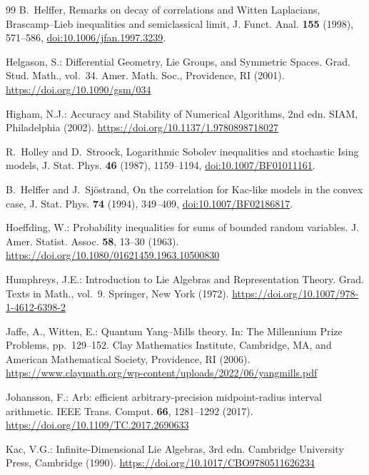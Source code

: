 \documentclass[11pt]{amsart}
\theoremstyle{definition}
\theoremstyle{remark}
\numberwithin{equation}{section}
\begin{document}
\begin{thebibliography}{99}
B.~Helffer, Remarks on decay of correlations and Witten Laplacians,
Brascamp--Lieb inequalities and semiclassical limit, J. Funct. Anal.
\textbf{155} (1998), 571--586,
\href{https://doi.org/10.1006/jfan.1997.3239}{doi:10.1006/jfan.1997.3239}.

Helgason, S.: Differential Geometry, Lie Groups, and Symmetric Spaces.
Grad. Stud. Math., vol.~34. Amer. Math. Soc., Providence, RI (2001).
\href{https://doi.org/10.1090/gsm/034}{https://doi.org/10.1090/gsm/034}

Higham, N.J.: Accuracy and Stability of Numerical Algorithms, 2nd edn.
SIAM, Philadelphia (2002).
\href{https://doi.org/10.1137/1.9780898718027}{https://doi.org/10.1137/1.9780898718027}

R.~Holley and D.~Stroock, Logarithmic Sobolev inequalities and stochastic
Ising models, J. Stat. Phys. \textbf{46} (1987), 1159--1194,
\href{https://doi.org/10.1007/BF01011161}{doi:10.1007/BF01011161}.

B.~Helffer and J.~Sj\"ostrand, On the correlation for Kac-like models in
the convex case, J. Stat. Phys. \textbf{74} (1994), 349--409,
\href{https://doi.org/10.1007/BF02186817}{doi:10.1007/BF02186817}.

Hoeffding, W.: Probability inequalities for sums of bounded random
variables. J. Amer. Statist. Assoc. \textbf{58}, 13--30 (1963).
\href{https://doi.org/10.1080/01621459.1963.10500830}{https://doi.org/10.1080/01621459.1963.10500830}

Humphreys, J.E.: Introduction to Lie Algebras and Representation Theory.
Grad. Texts in Math., vol.~9. Springer, New York (1972).
\href{https://doi.org/10.1007/978-1-4612-6398-2}{https://doi.org/10.1007/978-1-4612-6398-2}

Jaffe, A., Witten, E.: Quantum Yang--Mills theory. In: The Millennium
Prize Problems, pp.~129--152. Clay Mathematics Institute, Cambridge, MA,
and American Mathematical Society, Providence, RI (2006).
\url{https://www.claymath.org/wp-content/uploads/2022/06/yangmills.pdf}

Johansson, F.: Arb: efficient arbitrary-precision midpoint-radius interval
arithmetic. IEEE Trans. Comput. \textbf{66}, 1281--1292 (2017).
\href{https://doi.org/10.1109/TC.2017.2690633}{https://doi.org/10.1109/TC.2017.2690633}

Kac, V.G.: Infinite-Dimensional Lie Algebras, 3rd edn. Cambridge University Press, Cambridge (1990). \href{https://doi.org/10.1017/CBO9780511626234}{https://doi.org/10.1017/CBO9780511626234}


\end{thebibliography}
\end{document}
